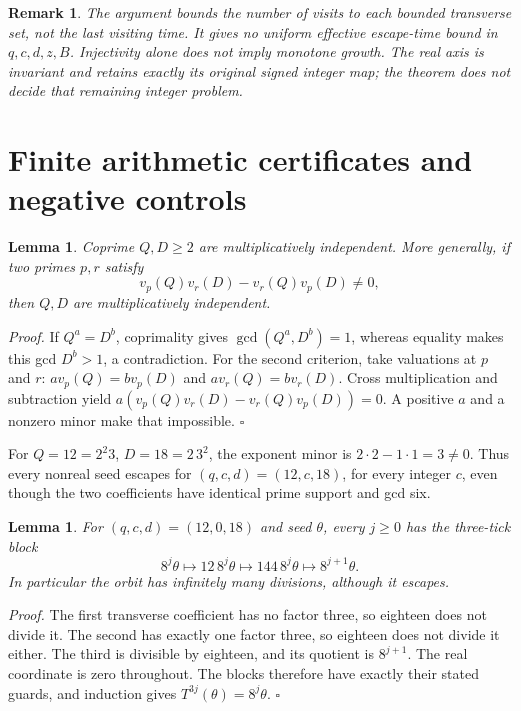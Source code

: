 \documentclass[11pt,letterpaper]{article}
\newtheorem{lemma}[theorem]{Lemma}
\newtheorem{remark}[theorem]{Remark}
\newenvironment{proof}{\noindent\textit{Proof.}}{\hfill\(\square\)}
\begin{document}
\begin{remark}
The argument bounds the number of visits to each bounded transverse set,
not the last visiting time. It gives no uniform effective escape-time
bound in \(q,c,d,z,B\). Injectivity alone does not imply monotone growth.
The real axis is invariant and retains exactly its original signed
integer map; the theorem does not decide that remaining integer problem.
\end{remark}

\section{Finite arithmetic certificates and negative controls}

\begin{lemma}\label{Lem:Certificate}
Coprime \(Q,D\ge2\) are multiplicatively independent. More generally,
if two primes \(p,r\) satisfy
\[
v_p(Q)v_r(D)-v_r(Q)v_p(D)\ne0,
\]
then \(Q,D\) are multiplicatively independent.
\end{lemma}
\begin{proof}
If \(Q^a=D^b\), coprimality gives
\(\gcd(Q^a,D^b)=1\), whereas equality makes this gcd \(D^b>1\), a
contradiction. For the second criterion, take valuations at \(p\) and
\(r\): \(a v_p(Q)=b v_p(D)\) and
\(a v_r(Q)=b v_r(D)\). Cross multiplication and subtraction yield
\(a(v_p(Q)v_r(D)-v_r(Q)v_p(D))=0\). A positive \(a\) and a nonzero
minor make that impossible.
\end{proof}

For \(Q=12=2^2 3\), \(D=18=2\,3^2\), the exponent minor is
\(2\cdot2-1\cdot1=3\ne0\). Thus every nonreal seed escapes for
\((q,c,d)=(12,c,18)\), for every integer \(c\), even though the two
coefficients have identical prime support and gcd six.

\begin{lemma}\label{Lem:InfiniteDivisions}
For \((q,c,d)=(12,0,18)\) and seed \(\theta\), every \(j\ge0\) has the
three-tick block
\[
8^j\theta\longmapsto12\,8^j\theta
\longmapsto144\,8^j\theta\longmapsto8^{j+1}\theta.
\]
In particular the orbit has infinitely many divisions, although it escapes.
\end{lemma}
\begin{proof}
The first transverse coefficient has no factor three, so eighteen does not
divide it. The second has exactly one factor three, so eighteen does not
divide it either. The third is divisible by eighteen, and its quotient
is \(8^{j+1}\). The real coordinate is zero throughout. The blocks
therefore have exactly their stated guards, and induction gives
\(T^{3j}(\theta)=8^j\theta\).
\end{proof}
\end{document}
